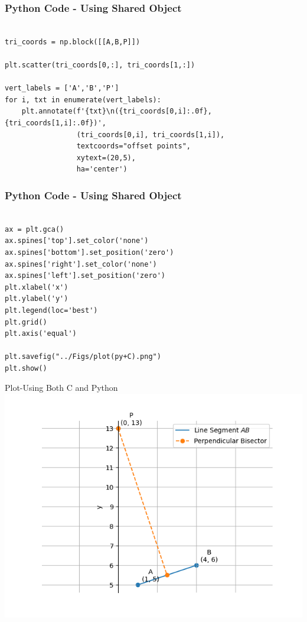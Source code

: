 \documentclass{beamer}
\begin{document}
\begin{frame}[fragile]
    \frametitle{Python Code - Using Shared Object}
    \begin{lstlisting}
    
tri_coords = np.block([[A,B,P]])

plt.scatter(tri_coords[0,:], tri_coords[1,:])

vert_labels = ['A','B','P']
for i, txt in enumerate(vert_labels):
    plt.annotate(f'{txt}\n({tri_coords[0,i]:.0f}, {tri_coords[1,i]:.0f})',
                 (tri_coords[0,i], tri_coords[1,i]), 
                 textcoords="offset points", 
                 xytext=(20,5), 
                 ha='center') 

\end{lstlisting}
\end{frame}



\begin{frame}[fragile]
    \frametitle{Python Code - Using Shared Object}
    \begin{lstlisting}
    
ax = plt.gca()
ax.spines['top'].set_color('none')
ax.spines['bottom'].set_position('zero')
ax.spines['right'].set_color('none')
ax.spines['left'].set_position('zero')
plt.xlabel('x')
plt.ylabel('y')
plt.legend(loc='best')
plt.grid()
plt.axis('equal')

plt.savefig("../Figs/plot(py+C).png")
plt.show()

\end{lstlisting}
\end{frame}

\begin{frame}{Plot-Using Both C and Python}
    \centering
    \includegraphics[width=\columnwidth, height=0.8\textheight, keepaspectratio]{Figs/plot(py+C).png}     
\end{frame}
\end{document}
